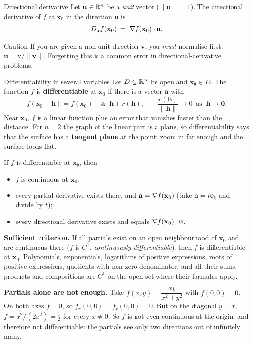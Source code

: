 \begin{rulebox}{Directional derivative}
Let $\mathbf{u}\in\mathbb{R}^n$ be a \emph{unit} vector ($\|\mathbf{u}\|=1$). The
directional derivative of $f$ at $\mathbf{x}_0$ in the direction
$\mathbf{u}$ is
\[
  D_{\mathbf{u}}f(\mathbf{x}_0) \;=\; \nabla f(\mathbf{x}_0)\cdot\mathbf{u} .
\]
\end{rulebox}

\begin{rulebox}{Caution}
If you are given a non-unit direction $\mathbf{v}$, you \emph{must}
normalise first: $\mathbf{u}=\mathbf{v}/\|\mathbf{v}\|$. Forgetting this is
a common error in directional-derivative problems.
\end{rulebox}

\begin{rulebox}{Differentiability in several variables}
Let $D\subseteq\mathbb{R}^{n}$ be open and $\mathbf{x}_{0}\in D$. The function $f$
is \textbf{differentiable}  at $\mathbf{x}_{0}$ if
there is a vector $\mathbf{a}$ with
\[
  f(\mathbf{x}_{0}+\mathbf{h})=f(\mathbf{x}_{0})+\mathbf{a}\cdot\mathbf{h}
  +r(\mathbf{h}),
  \qquad
  \frac{r(\mathbf{h})}{\|\mathbf{h}\|}\to0\ \text{ as }\ \mathbf{h}\to\mathbf{0}.
\]
Near $\mathbf{x}_{0}$, $f$ is a linear function plus an error that vanishes
faster than the distance. For $n=2$ the graph of the linear part is a plane,
so differentiability says that the surface has a \textbf{tangent plane} at
the point: zoom in far enough and the surface looks flat.

If $f$ is differentiable at $\mathbf{x}_{0}$, then
\begin{itemize}[leftmargin=1.6em,itemsep=0.3ex]
  \item $f$ is continuous at $\mathbf{x}_{0}$;
  \item every partial derivative exists there, and
        $\mathbf{a}=\nabla f(\mathbf{x}_{0})$ (take
        $\mathbf{h}=t\mathbf{e}_{k}$ and divide by $t$);
  \item every directional derivative exists and equals
        $\nabla f(\mathbf{x}_{0})\cdot\mathbf{u}$.
\end{itemize}
\textbf{Sufficient criterion.} If all partials exist on an open
neighbourhood of $\mathbf{x}_{0}$ and are continuous there ($f$ is
$C^{1}$, \emph{continuously differentiable}), then $f$ is differentiable at
$\mathbf{x}_{0}$. Polynomials, exponentials, logarithms of positive
expressions, roots of positive expressions, quotients with non-zero
denominator, and all their sums, products and compositions are $C^{1}$ on
the open set where their formulas apply.

\textbf{Partials alone are not enough.} Take
$f(x,y)=\dfrac{xy}{x^{2}+y^{2}}$ with $f(0,0)=0$. On both axes $f=0$, so
$f_{x}(0,0)=f_{y}(0,0)=0$. But on the diagonal $y=x$,
$f=x^{2}/(2x^{2})=\tfrac12$ for every $x\neq0$. So $f$ is not even
continuous at the origin, and therefore not differentiable: the partials
see only two directions out of infinitely many.
\end{rulebox}

